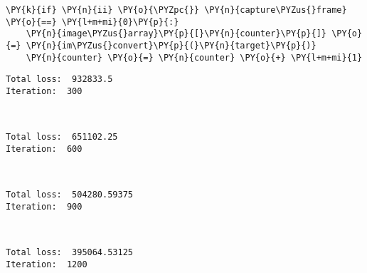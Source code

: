 \begin{tcolorbox}[breakable, size=fbox, boxrule=1pt, pad at break*=1mm,colback=cellbackground, colframe=cellborder]
\begin{Verbatim}[commandchars=\\\{\}]
  \PY{k}{if} \PY{n}{ii} \PY{o}{\PYZpc{}} \PY{n}{capture\PYZus{}frame} \PY{o}{==} \PY{l+m+mi}{0}\PY{p}{:}
    \PY{n}{image\PYZus{}array}\PY{p}{[}\PY{n}{counter}\PY{p}{]} \PY{o}{=} \PY{n}{im\PYZus{}convert}\PY{p}{(}\PY{n}{target}\PY{p}{)}
    \PY{n}{counter} \PY{o}{=} \PY{n}{counter} \PY{o}{+} \PY{l+m+mi}{1}
\end{Verbatim}
\end{tcolorbox}

    \begin{Verbatim}[commandchars=\\\{\}]
Total loss:  932833.5
Iteration:  300
    \end{Verbatim}

    \begin{center}
    \end{center}
    { \hspace*{\fill} \\}
    
    \begin{Verbatim}[commandchars=\\\{\}]
Total loss:  651102.25
Iteration:  600
    \end{Verbatim}

    \begin{center}
    \end{center}
    { \hspace*{\fill} \\}
    
    \begin{Verbatim}[commandchars=\\\{\}]
Total loss:  504280.59375
Iteration:  900
    \end{Verbatim}

    \begin{center}
    \end{center}
    { \hspace*{\fill} \\}
    
    \begin{Verbatim}[commandchars=\\\{\}]
Total loss:  395064.53125
Iteration:  1200
    \end{Verbatim}

